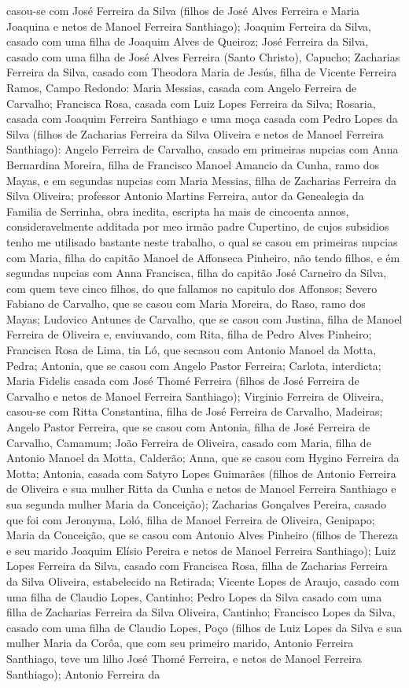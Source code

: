 casou-se com José Ferreira da Silva (filhos de José Alves Ferreira e Maria Joaquina e netos de Manoel Ferreira Santhiago); Joaquim Ferreira da Silva, casado com uma filha de Joaquim Alves de Queiroz; José Ferreira da Silva, casado com uma filha de José Alves Ferreira (Santo Christo), Capucho; Zacharias Ferreira da Silva, casado com Theodora Maria de Jesús, filha de Vicente Ferreira Ramos, Campo Redondo: Maria Messias, casada com Angelo Ferreira de Carvalho; Francisca Rosa, casada com Luiz Lopes Ferreira da Silva; Rosaria, casada com Joaquim Ferreira Santhiago e uma moça casada com Pedro Lopes da Silva (filhos de Zacharias Ferreira da Silva Oliveira e netos de Manoel Ferreira Santhiago): Angelo Ferreira de Carvalho, casado em primeiras nupcias com Anna Bernardina Moreira, filha de Francisco Manoel Amancio da Cunha, ramo dos Mayas, e em segundas nupcias com Maria Messias, filha de Zacharias Ferreira da Silva Oliveira; professor Antonio Martins Ferreira, autor da Genealegia da Familia de Serrinha, obra inedita, escripta ha mais de cincoenta annos, consideravelmente additada por meo irmão padre Cupertino, de cujos subsidios tenho me utilisado bastante neste trabalho, o qual se casou em primeiras nupcias com Maria, filha do capitão Manoel de Affonseca Pinheiro, não tendo filhos, e ém segundas nupcias com Anna Francisca, filha do capitão José Carneiro da Silva, com quem teve cinco filhos, do que fallamos no capitulo dos Affonsos; Severo Fabiano de Carvalho, que se casou com Maria Moreira, do Raso, ramo dos Mayas; Ludovico Antunes de Carvalho, que se casou com Justina, filha de Manoel Ferreira de Oliveira e, enviuvando, com Rita, filha de Pedro Alves Pinheiro; Francisca Rosa de Lima, tia Ló, que secasou com Antonio Manoel da Motta, Pedra; Antonia, que se casou com Angelo Pastor Ferreira; Carlota, interdicta; Maria Fidelis casada com José Thomé Ferreira (filhos de José Ferreira de Carvalho e netos de Manoel Ferreira Santhiago); Virginio Ferreira de Oliveira, casou-se com Ritta Constantina, filha de José Ferreira de Carvalho, Madeiras; Angelo Pastor Ferreira, que se casou com Antonia, filha de José Ferreira de Carvalho, Camamum; João Ferreira de Oliveira, casado com Maria, filha de Antonio Manoel da Motta, Calderão; Anna, que se casou com Hygino Ferreira da Motta; Antonia, casada com Satyro Lopes Guimarães (filhos de Antonio Ferreira de Oliveira e sua mulher Ritta da Cunha e netos de Manoel Ferreira Santhiago e sua segunda mulher Maria da Conceição); Zacharias Gonçalves Pereira, casado que foi com Jeronyma, Loló, filha de Manoel Ferreira de Oliveira, Genipapo; Maria da Conceição, que se casou com Antonio Alves Pinheiro (filhos de Thereza e seu marido Joaquim Elísio Pereira e netos de Manoel Ferreira Santhiago); Luiz Lopes Ferreira da Silva, casado com Francisca Rosa, filha de Zacharias Ferreira da Silva Oliveira, estabelecido na Retirada; Vicente Lopes de Araujo, casado com uma filha de Claudio Lopes, Cantinho; Pedro Lopes da Silva casado com uma filha de Zacharias Ferreira da Silva Oliveira, Cantinho; Francisco Lopes da Silva, casado com uma filha de Claudio Lopes, Poço (filhos de Luiz Lopes da Silva e sua mulher Maria da Corôa, que com seu primeiro marido, Antonio Ferreira Santhiago, teve um lilho José Thomé Ferreira, e netos de Manoel Ferreira Santhiago); Antonio Ferreira da 